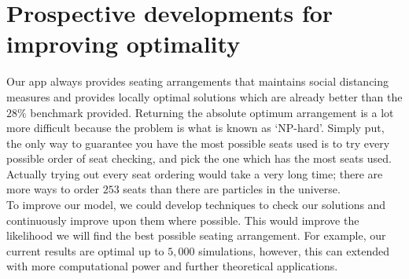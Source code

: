 \documentclass[11pt,a4paper]{article}
\begin{document}
\section*{Prospective developments for improving optimality}
Our app always provides seating arrangements that maintains social distancing measures and provides locally optimal solutions which are already better than the $28\%$ benchmark provided. Returning the  absolute optimum arrangement is a lot more difficult because the problem is what is known as `NP-hard'.  Simply put, the only way to guarantee you have the most possible seats used is to try every possible order of seat checking, and pick the one which has the most seats used. Actually trying out every seat ordering would take a very long time; there are more ways to order $253$ seats than there are particles in the universe.\\

To improve our model, we could develop techniques to check our solutions and continuously improve upon them where possible. This would improve the likelihood we will find the best possible seating arrangement. For example, our current results are optimal up to $5,000$ simulations, however, this can extended with more computational power and further theoretical applications.\\
\end{document}
